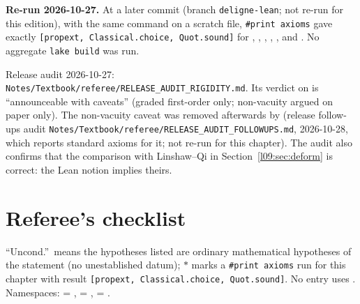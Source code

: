 \textbf{Re-run 2026-10-27.} At a later commit (branch \texttt{deligne-lean}; not re-run for this edition), with the same command on a
scratch file, \texttt{\#print axioms} gave exactly \texttt{[propext, Classical.choice, Quot.sound]} for
, ,
, ,
,  and
. No aggregate \texttt{lake build} was run.

Release audit 2026-10-27: \texttt{Notes/Textbook/referee/RELEASE\_AUDIT\_RIGIDITY.md}. Its verdict on
 is ``announceable with caveats'' (graded first-order only; non-vacuity
argued on paper only). The non-vacuity caveat was removed afterwards by \allowbreak{}\allowbreak{}\allowbreak{}\allowbreak{}
(release follow-ups audit \texttt{Notes/Textbook/referee/RELEASE\_AUDIT\_FOLLOWUPS.md}, 2026-10-28, which reports
standard axioms for it; not re-run for this chapter). The audit also confirms that the comparison with Linshaw--Qi in Section~\ref{l09:sec:deform}
is correct: the Lean notion implies theirs.

\section{Referee's checklist}\label{l09:sec:checklist}

``Uncond.''\ means the hypotheses listed are ordinary mathematical hypotheses of the statement (no
unestablished datum); $\ast$ marks a \texttt{\#print axioms} run for this chapter with result
\texttt{[propext, Classical.choice, Quot.sound]}. No entry uses . Namespaces:
 = ,  = ,
 = .

